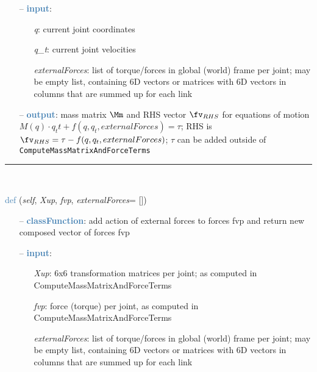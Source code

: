 \begin{itemize}[leftmargin=1.4cm]
\begin{itemize}[leftmargin=0.5cm]
\begin{itemize}[leftmargin=1.4cm]
\begin{itemize}[leftmargin=1.4cm]
\begin{itemize}[leftmargin=0.5cm]
\begin{itemize}[leftmargin=1.4cm]
\begin{itemize}[leftmargin=0.5cm]
\begin{itemize}[leftmargin=1.4cm]
\begin{itemize}[leftmargin=1.4cm]
\begin{itemize}[leftmargin=1.4cm]
\begin{itemize}[leftmargin=0.7cm]
\begin{itemize}[leftmargin=1.2cm]
  \end{itemize}
  \item[--]  \textcolor{steelblue}{\bf input}: \vspace{-6pt}
  \begin{itemize}[leftmargin=1.2cm]
\setlength{\itemindent}{-0.7cm}
    \item[] {\it q}: current joint coordinates
    \item[] {\it   q\_t}: current joint velocities
    \item[] {\it   externalForces}: list of torque/forces in global (world) frame per joint; may be empty list, containing 6D vectors or matrices with 6D vectors in columns that are summed up for each link
  \end{itemize}
  \item[--]  \textcolor{steelblue}{\bf output}: mass matrix $\Mm$ and RHS vector $\fv_{RHS}$ for equations of motion $M(q) \cdot q_tt + f(q,q_t,externalForces) = \tau$; RHS is $\fv_{RHS}=\tau - f(q,q_t,externalForces)$; $\tau$ can be added outside of \texttt{ComputeMassMatrixAndForceTerms}\vspace{12pt}\end{itemize}
%
\noindent\rule{8cm}{0.75pt}\vspace{1pt} \\ 
\begin{flushleft}
\noindent \textcolor{steelblue}{def {\bf {}}}\label{sec:kinematicTree:KinematicTree66:AddExternalForces}
({\it self}, {\it Xup}, {\it fvp}, {\it externalForces}= [])
\end{flushleft}
\setlength{\itemindent}{0.7cm}
\begin{itemize}[leftmargin=0.7cm]
  \item[--]  \textcolor{steelblue}{\bf classFunction}: add action of external forces to forces fvp and return new composed vector of forces fvp  \item[--]  \textcolor{steelblue}{\bf input}: \vspace{-6pt}
  \begin{itemize}[leftmargin=1.2cm]
\setlength{\itemindent}{-0.7cm}
    \item[] {\it Xup}: 6x6 transformation matrices per joint; as computed in ComputeMassMatrixAndForceTerms
    \item[] {\it   fvp}: force (torque) per joint, as computed in ComputeMassMatrixAndForceTerms
    \item[] {\it   externalForces}: list of torque/forces in global (world) frame per joint; may be empty list, containing 6D vectors or matrices with 6D vectors in columns that are summed up for each link

\end{itemize}
\end{itemize}
\end{itemize}
\end{itemize}
\end{itemize}
\end{itemize}
\end{itemize}
\end{itemize}
\end{itemize}
\end{itemize}
\end{itemize}
\end{itemize}
